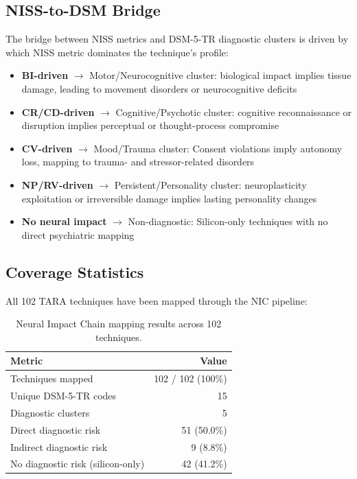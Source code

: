 \subsection{NISS-to-DSM Bridge}

The bridge between NISS metrics and DSM-5-TR diagnostic clusters is driven by
which NISS metric dominates the technique's profile:

\begin{itemize}
  \item \textbf{BI-driven} $\to$ Motor/Neurocognitive cluster: biological
        impact implies tissue damage, leading to movement disorders or
        neurocognitive deficits
  \item \textbf{CR/CD-driven} $\to$ Cognitive/Psychotic cluster: cognitive
        reconnaissance or disruption implies perceptual or thought-process compromise
  \item \textbf{CV-driven} $\to$ Mood/Trauma cluster: Consent violations
        imply autonomy loss, mapping to trauma- and stressor-related disorders
  \item \textbf{NP/RV-driven} $\to$ Persistent/Personality cluster:\linebreak
        neuroplasticity exploitation or irreversible damage implies
        lasting personality changes
  \item \textbf{No neural impact} $\to$ Non-diagnostic: Silicon-only
        techniques with no direct psychiatric mapping
\end{itemize}

\subsection{Coverage Statistics}

All 102 TARA techniques have been mapped through the NIC pipeline:

\begin{table}[H]
\centering
\caption{Neural Impact Chain mapping results across 102 techniques.}
\label{tab:nic-stats}
\small
\begin{tabular}{@{}l r@{}}
\toprule
\textbf{Metric} & \textbf{Value} \\
\midrule
Techniques mapped                 & 102 / 102 (100\%) \\
Unique DSM-5-TR codes             & 15 \\
Diagnostic clusters               & 5 \\
Direct diagnostic risk             & 51 (50.0\%) \\
Indirect diagnostic risk           & 9 (8.8\%) \\
No diagnostic risk (silicon-only)  & 42 (41.2\%) \\
\bottomrule
\end{tabular}
\end{table}

